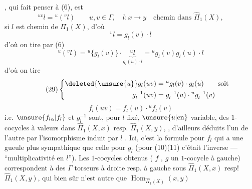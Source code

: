 , qui fait penser à (6), est
\[
\tag{28}{}^{uv}l={}^u({}^vl)
\qquad u,v\in\Gamma,\quad l:x\longrightarrow y\quad\text{chemin dans }\widehat\Pi_1(X),
\]
 si $l$ est chemin de $\Pi_1(X)$, d'où
\[
{}^vl=g_l(v)\cdot l
\]
 d'où on tire par (6)
\[
{}^u({}^vl)={}^u\{g_l(v)\}\cdot\underbrace{{}^ul}_{g_l(u)\cdot l}
={}^ug_l(v)g_l(u)\cdot l
\]
d'où on tire
\[
\tag{29}\left\{\begin{aligned}
\deleted{\unsure{u}}g_l(uv)&={}^ug_l(v)\cdot g_l(u)\qquad\text{soit}\\
g_l^{-1}(uv)&=g_l^{-1}(u)\cdot{}^ug_l^{-1}(v)
\end{aligned}\right.
\]
\[
\tag{30}f_l(uv)=f_l(u)\cdot{}^uf_l(v)
\]
i.e. $\unsure{f_{l\alpha}|f_l}$ et $g_l^{-1}$ sont, pour $l$ fixé, $\unsure{u|\text{en}}$ variable, des $1$-cocycles  à valeurs dans $\widehat\Pi_1(X,x)$ resp. $\widehat\Pi_1(X,y)$, , d'ailleurs déduits l'un de l'autre par l'isomorphisme
induit par $l$ . Ici, c'est la formule pour $f_l$ qui a une gueule plus sympathique que celle pour $g_l$ (pour (10)(11) c'était l'inverse ---  ``multiplicativité en $l$''). Les $1$-cocycles obtenus ( $f$  , $g$ un $1$-cocycle à gauche) correspondent à des $\Gamma$ torseurs à droite resp. à gauche sous $\widehat\Pi_1(X,x)$ resp! $\widehat\Pi_1(X,y)$, qui bien sûr n'est autre que $\operatorname{Hom}_{\widehat\Pi_1(X)}(x,y)$

